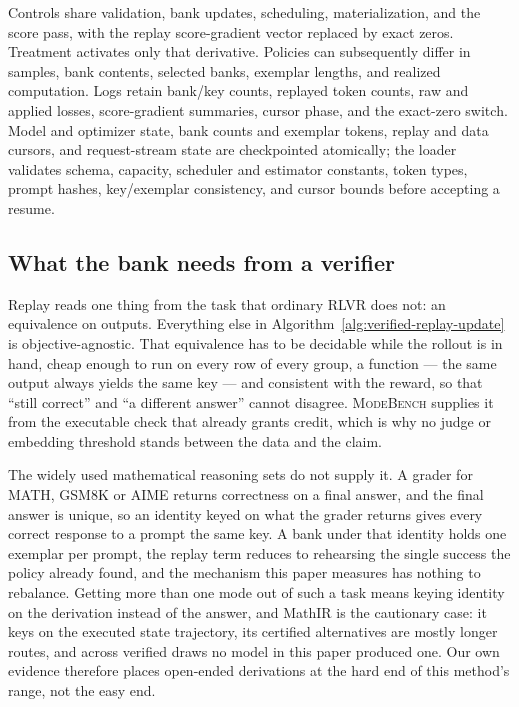 \documentclass{article}
\newcommand{\1}{\mathbf 1}
\newcommand{\mb}{\textsc{ModeBench}}
\theoremstyle{remark}
\theoremstyle{definition}
\theoremstyle{plain}
\begin{document}
Controls share validation, bank updates, scheduling, materialization, and
the score pass, with the replay score-gradient vector replaced by exact
zeros. Treatment activates only that derivative. Policies can subsequently
differ in samples, bank contents, selected banks, exemplar lengths, and
realized computation. Logs retain bank/key counts, replayed token counts,
raw and applied losses, score-gradient summaries, cursor phase, and the
exact-zero switch. Model and optimizer state, bank counts and exemplar
tokens, replay and data cursors, and request-stream state are checkpointed
atomically; the loader validates schema, capacity, scheduler and estimator
constants, token types, prompt hashes, key/exemplar consistency, and cursor
bounds before accepting a resume.

\subsection{What the bank needs from a verifier}
\label{app:algorithm-identity}

Replay reads one thing from the task that ordinary RLVR does not: an
equivalence on outputs. Everything else in Algorithm~\ref{alg:verified-replay-update}
is objective-agnostic. That equivalence has to be decidable while the rollout
is in hand, cheap enough to run on every row of every group, a function --- the
same output always yields the same key --- and consistent with the reward, so
that ``still correct'' and ``a different answer'' cannot disagree. \mb{}
supplies it from the executable check that already grants credit, which is why
no judge or embedding threshold stands between the data and the claim.

The widely used mathematical reasoning sets do not supply it. A grader for
MATH, GSM8K or AIME returns correctness on a final answer, and the final
answer is unique, so an identity keyed on what the grader returns gives every
correct response to a prompt the same key. A bank under that identity holds
one exemplar per prompt, the replay term reduces to rehearsing the single
success the policy already found, and the mechanism this paper measures has
nothing to rebalance. Getting more than one mode out of such a task means
keying identity on the derivation instead of the answer, and MathIR is the
cautionary case: it keys on the executed state trajectory, its certified
alternatives are mostly longer routes, and across \MIRdraws{} verified draws
no model in this paper produced one. Our own evidence therefore places open-ended derivations at the hard end
of this method's range, not the easy end.
\end{document}
